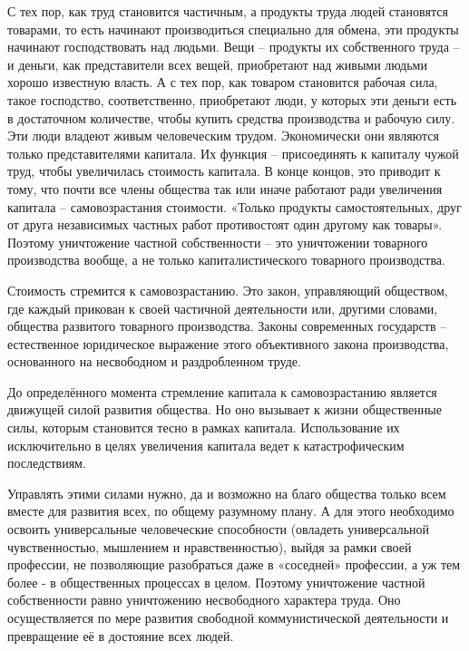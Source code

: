 \documentclass[12pt,a4paper,openany]{book}
\begin{document}
С тех пор, как труд становится частичным, а продукты труда людей становятся товарами, то есть начинают производиться специально для обмена, эти продукты начинают господствовать над людьми. Вещи – продукты их собственного труда – и деньги, как представители всех вещей, приобретают над живыми людьми хорошо известную власть. А с тех пор, как товаром становится рабочая сила, такое господство, соответственно, приобретают люди, у которых эти деньги есть в достаточном количестве, чтобы купить средства производства и рабочую силу. Эти люди владеют живым человеческим трудом. Экономически они являются только представителями капитала. Их функция – присоединять к капиталу чужой труд, чтобы увеличилась стоимость капитала. В конце концов, это приводит к тому, что почти все члены общества так или иначе работают ради увеличения капитала – самовозрастания стоимости. «Только продукты самостоятельных, друг от друга независимых частных работ противостоят один другому как товары». Поэтому уничтожение частной собственности – это уничтожении товарного производства вообще, а не только капиталистического товарного производства.

Стоимость стремится к самовозрастанию. Это закон, управляющий обществом, где каждый прикован к своей частичной деятельности или, другими словами, общества развитого товарного производства. Законы современных государств – естественное юридическое выражение этого объективного закона производства, основанного на несвободном и раздробленном труде.

До определённого момента стремление капитала к самовозрастанию является движущей силой развития общества. Но оно вызывает к жизни общественные силы, которым становится тесно в рамках капитала. Использование их исключительно в целях увеличения капитала ведет к катастрофическим последствиям.

Управлять этими силами нужно, да и возможно на благо общества только всем вместе для развития всех, по общему разумному плану. А для этого необходимо освоить универсальные человеческие способности (овладеть универсальной чувственностью, мышлением и нравственностью), выйдя за рамки своей профессии, не позволяющие разобраться даже в «соседней» профессии, а уж тем более - в общественных процессах в целом. Поэтому уничтожение частной собственности равно уничтожению несвободного характера труда. Оно осуществляется по мере развития свободной коммунистической деятельности и превращение её в достояние всех людей.
\end{document}
